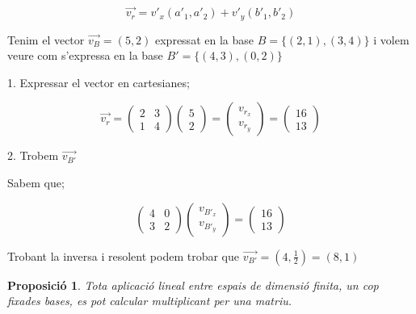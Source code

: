 \documentclass[12pt]{article}
\newtheorem{proposicio}{Proposició}[section]
\begin{document}
\[\vec{v_r} = v'_x(a'_1, a'_2) + v'_y(b'_1, b'_2)\] 
\begin{examplebox}{}
    Tenim el vector $\vec{v_B} = (5,2)$ expressat en la base $B = \{(2,1), (3,4)\}$ i volem veure com s'expressa en la base $B' = \{(4,3),(0,2)\}$

    1. Expressar el vector en cartesianes;

    \[\vec{v_r} = \begin{pmatrix}
        2 & 3\\
        1 & 4
    \end{pmatrix}\begin{pmatrix}
        5\\
        2
    \end{pmatrix} = \begin{pmatrix}
        v_{r_x}\\
        v_{r_y}
    \end{pmatrix} = \begin{pmatrix}
        16\\
        13
    \end{pmatrix}\]

    2. Trobem $\vec{v_{B'}}$

    Sabem que;

    \[\begin{pmatrix}
        4&0\\
        3&2
    \end{pmatrix}\begin{pmatrix}
        v_{B'_x}\\
        v_{B'_y}
    \end{pmatrix} = \begin{pmatrix}
        16\\
        13
    \end{pmatrix}\]

    Trobant la inversa i resolent podem trobar que $\vec{v_{B'}} = (4,\frac{1}{2}) = (8,1)$
\end{examplebox}

\begin{proposicio}
    Tota aplicació lineal entre espais de dimensió finita, un cop fixades bases, es pot calcular multiplicant per una matriu.
\end{proposicio}
\end{document}
